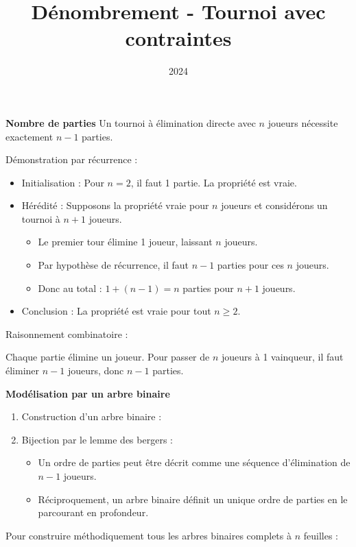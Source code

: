 \documentclass[10pt,a4paper]{article}
\title{Dénombrement - Tournoi avec contraintes}
\author{}
\date{2024}
\begin{document}
\q \textbf{Nombre de parties}
Un tournoi à élimination directe avec $n$ joueurs nécessite exactement $n-1$ parties.

Démonstration par récurrence :
\begin{itemize}
     \item Initialisation : Pour $n = 2$, il faut 1 partie. La propriété est vraie.
     \item Hérédité : Supposons la propriété vraie pour $n$ joueurs et considérons un tournoi à
     $n+1$ joueurs.
     \begin{itemize}
          \item Le premier tour élimine 1 joueur, laissant $n$ joueurs.
          \item Par hypothèse de récurrence, il faut $n-1$ parties pour ces $n$ joueurs.
          \item Donc au total : $1 + (n-1) = n$ parties pour $n+1$ joueurs.
     \end{itemize}
     \item Conclusion : La propriété est vraie pour tout $n \geq 2$.
\end{itemize}

Raisonnement combinatoire :

Chaque partie élimine un joueur. Pour passer de $n$ joueurs à 1 vainqueur, il faut éliminer $n-1$
joueurs, donc $n-1$ parties.


\q \textbf{Modélisation par un arbre binaire}
\begin{enumerate}

    \item Construction d'un arbre binaire :


    \item Bijection par le lemme des bergers :
    \begin{itemize}
        \item Un ordre de parties peut être décrit comme une séquence d'élimination de \( n-1 \)
        joueurs.
        \item Réciproquement, un arbre binaire définit un unique ordre de parties en le parcourant
        en profondeur.
    \end{itemize}
\end{enumerate}

Pour construire méthodiquement tous les arbres binaires complets à \( n \) feuilles :
\end{document}
